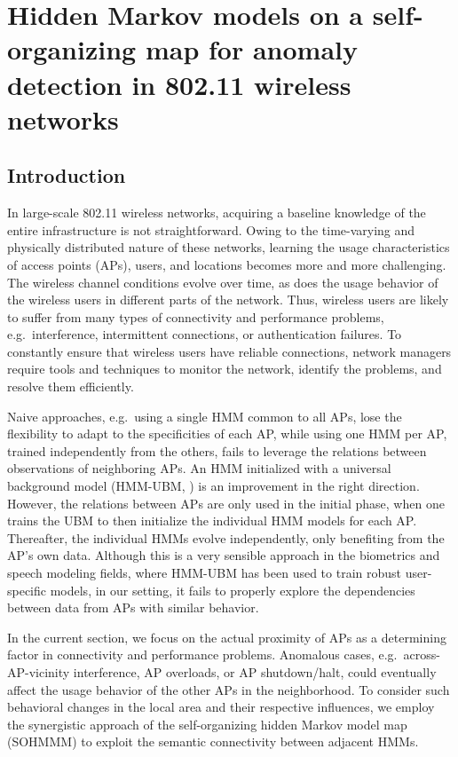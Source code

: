 \section{Hidden Markov models on a self-organizing map for anomaly detection in 802.11 wireless networks}
\label{sec:sohmmm}

\subsection{Introduction}
\label{sec:sohmmm_intro}
In large-scale 802.11 wireless networks, acquiring a baseline knowledge of the entire infrastructure is not straightforward. Owing to the time-varying and physically distributed nature of these networks, learning the usage characteristics of access points (APs), users, and locations becomes more and more challenging. The wireless channel conditions evolve over time, as does the usage behavior of the wireless users in different parts of the network. Thus, wireless users are likely to suffer from many types of connectivity and performance problems, e.g.\ interference, intermittent connections, or authentication failures. To constantly ensure that wireless users have reliable connections, network managers require tools and techniques to monitor the network, identify the problems, and resolve them efficiently.

Naive approaches, e.g.\ using a single HMM common to all APs, lose the flexibility to adapt to the specificities of each AP, while using one HMM per AP, trained independently from the others, fails to leverage the relations between observations of neighboring APs. An HMM initialized with a universal background model (HMM-UBM, \citet{Anisa2017}) is an improvement in the right direction. However, the relations between APs are only used in the initial phase, when one trains the UBM to then initialize the individual HMM models for each AP. Thereafter, the individual HMMs evolve independently, only benefiting from the AP's own data. Although this is a very sensible approach in the biometrics and speech modeling fields, where HMM-UBM has been used to train robust user-specific models, in our setting, it fails to properly explore the dependencies between data from APs with similar behavior.

In the current section, we focus on the actual proximity of APs as a determining factor in connectivity and performance problems. Anomalous cases, e.g.\ across-AP-vicinity interference, AP overloads, or AP shutdown/halt, could eventually affect the usage behavior of the other APs in the neighborhood. To consider such behavioral changes in the local area and their respective influences, we employ the synergistic approach of the self-organizing hidden Markov model map (SOHMMM) to exploit the semantic connectivity between adjacent HMMs.

